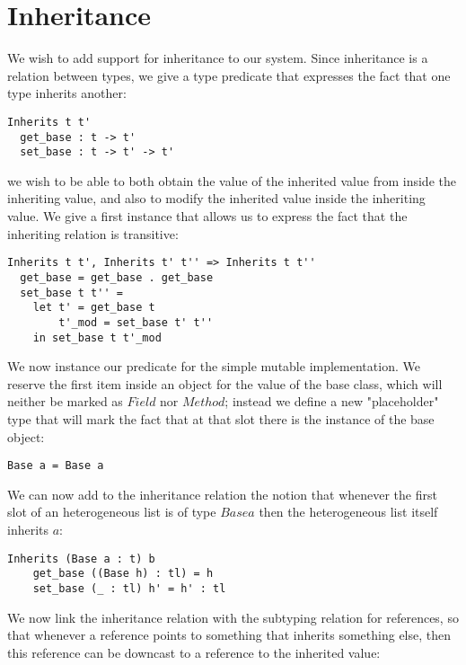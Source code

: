 \documentclass[a4paper]{article}
\begin{document}
\section{Inheritance}

We wish to add support for inheritance to our system. Since inheritance is a relation between types, we give a 
type predicate that expresses the fact that one type inherits another:

\begin{lstlisting}
Inherits t t'
  get_base : t -> t'
  set_base : t -> t' -> t'
\end{lstlisting}

we wish to be able to both obtain the value of the inherited value from inside the inheriting value, and also to 
modify the inherited value inside the inheriting value. We give a first instance that allows us to express the fact 
that the inheriting relation is transitive:

\begin{lstlisting}
Inherits t t', Inherits t' t'' => Inherits t t''
  get_base = get_base . get_base
  set_base t t'' =
    let t' = get_base t
        t'_mod = set_base t' t''
    in set_base t t'_mod
\end{lstlisting}

We now instance our predicate for the simple mutable implementation. We reserve the first item inside an object for 
the value of the base class, which will neither be marked as $Field$ nor $Method$; instead we define a new "placeholder" 
type that will mark the fact that at that slot there is the instance of the base object:

\begin{lstlisting}
Base a = Base a
\end{lstlisting}

We can now add to the inheritance relation the notion that whenever the first slot of an heterogeneous list is of type 
$Base a$ then the heterogeneous list itself inherits $a$:

\begin{lstlisting}
Inherits (Base a : t) b
    get_base ((Base h) : tl) = h
    set_base (_ : tl) h' = h' : tl
\end{lstlisting}

We now link the inheritance relation with the subtyping relation for references, so that whenever a reference points to 
something that inherits something else, then this reference can be downcast to a reference to the inherited value:
\end{document}
